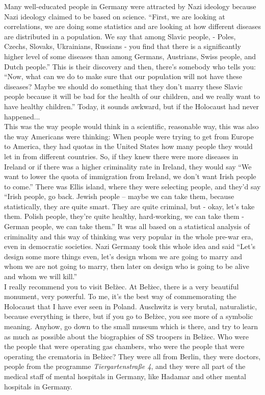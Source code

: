 Many well-educated people in Germany were attracted by Nazi ideology because Nazi ideology claimed to be based on science. ``First, we are  looking at correlations, we are doing some statistics and are looking at how different diseases are distributed in a population. We say that among Slavic people, - Poles, Czechs, Slovaks, Ukrainians, Russians - you find that there is a significantly higher level of some diseases than among Germans, Austrians, Swiss people, and Dutch people.'' This is their discovery and then, there’s somebody who tells you: ``Now, what can we do to make sure that our population will not have these diseases? Maybe we should do something that they don’t marry these Slavic people because it will be bad for the health of our children, and we really want to have healthy children.'' Today, it sounds awkward, but if the Holocaust had never happened...\\
This was the way people would think in a scientific, reasonable way, this was also the way Americans were thinking: When people were trying to get from Europe to America, they had quotas in the United States how many people they would let in from different countries. So, if they knew there were more diseases in Ireland or if there was a higher criminality rate in Ireland, they would say ``We want to lower the quota of immigration from Ireland, we don’t want Irish people to come.'' There was Ellis island, where they were selecting people, and they’d say ``Irish people, go back. Jewish people – maybe we can take them, because statistically, they are quite smart. They are quite criminal, but - okay, let’s take them. Polish people, they’re quite healthy, hard-working, we can take them - German people, we can take them.'' It was all based on a statistical analysis of criminality and this way of thinking was very popular in the whole pre-war era, even in democratic societies. Nazi Germany took this whole idea and said ``Let’s design some more things even, let’s design whom we are going to marry and whom we are not going to marry, then later on design who is going to be alive and whom we will kill.''\\
I really recommend you to visit Bełżec. At Bełżec, there is a very beautiful monument, very powerful. To me, it’s the best way of commemorating the Holocaust that I have ever seen in Poland. Auschwitz is very brutal, naturalistic, because everything is there, but if you go to Bełżec, you see more of a symbolic meaning. Anyhow, go down to the small museum which is there, and try to learn as much as possible about the biographies of SS troopers in Bełżec. Who were the people that were operating gas chambers, who were the people that were operating the crematoria in Bełżec? They were all from Berlin, they were doctors, people from the programme \textit{Tiergartenstraße 4}, and they were all part of the medical staff of mental hospitals in Germany, like Hadamar and other mental hospitals in Germany.\\
